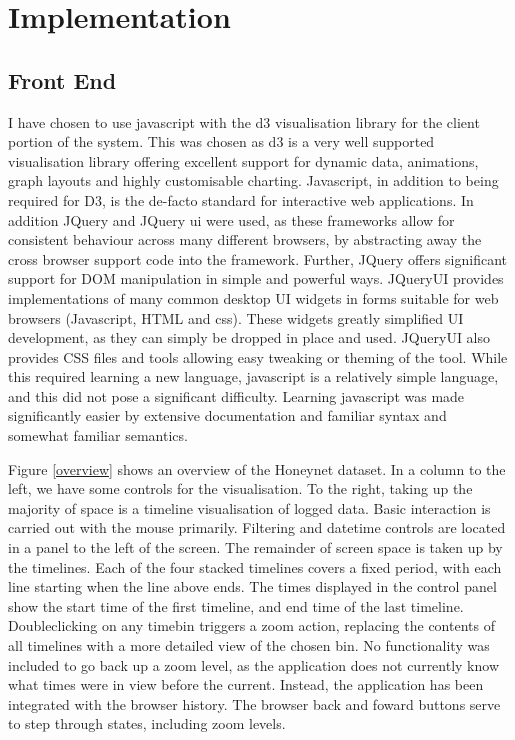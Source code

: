 \chapter{Implementation}\label{C:impl}

\section{Front End}  %

I have chosen to use javascript with the d3 visualisation library \cite{bostock2011d3} for the client portion of the system. This was chosen as d3 is a very well supported visualisation library offering excellent support for dynamic data, animations, graph layouts and highly customisable charting. Javascript, in addition to being required for D3, is the de-facto standard for interactive web applications. 
In addition JQuery and JQuery ui were used, as these frameworks allow for consistent behaviour across many different browsers, by abstracting away the cross browser support code into the framework. Further, JQuery offers significant support for DOM manipulation in simple and powerful ways. JQueryUI provides implementations of many common desktop UI widgets in forms suitable for web browsers (Javascript, HTML and css). These widgets greatly simplified UI development, as they can simply be dropped in place and used. JQueryUI also provides CSS files and tools allowing easy tweaking or theming of the tool.
While this required learning a new language, javascript is a relatively simple language, and this did not pose a significant difficulty. Learning javascript was made significantly easier by extensive documentation and familiar syntax and somewhat familiar semantics. 

Figure \ref{overview} shows an overview of the Honeynet dataset. In a column to the left, we have some controls for the visualisation. To the right, taking up the majority of space is a timeline visualisation of logged data.  
Basic interaction is carried out with the mouse primarily. Filtering and datetime controls are located in a panel to the left of the screen. The remainder of screen space is taken up by the timelines. 
Each of the four stacked timelines covers a fixed period, with each line starting when the line above ends. The times displayed in the control panel show the start time of the first timeline, and end time of the last timeline.
Doubleclicking on any timebin triggers a zoom action, replacing the contents of all timelines with a more detailed view of the chosen bin. 
No functionality was included to go back up a zoom level, as the application does not currently know what times were in view before the current. Instead, the application has been integrated with the browser history. The browser back and foward buttons serve to step through states, including zoom levels. 

